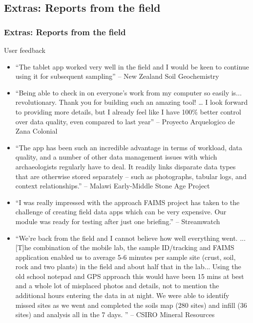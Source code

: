 \documentclass[
	aspectratio=169, %
	12pt, %
	t, %
]{beamer}
\begin{document}
\begin{refsegment}
\section{Extras: Reports from the field}

\begin{sectionframe} %
	\frametitle{Extras: Reports from the field}


\end{sectionframe}

\begin{frame}[allowframebreaks]{User feedback}
    \begin{itemize}
        \item ``The tablet app worked very well in the field and I would be keen to continue using it for subsequent sampling'' -- New Zealand Soil Geochemistry
        \item ``Being able to check in on everyone's work from my computer so easily is... revolutionary. Thank you for building such an amazing tool! …  I look forward to providing more details, but I already feel like I have 100\%{} better control over data quality, even compared to last year'' -- Proyecto Arquelogico de Zana Colonial
        \item ``The app has been such an incredible advantage in terms of workload, data quality, and a number of other data management issues with which archaeologists regularly have to deal. It readily links disparate data types that are otherwise stored separately – such as photographs, tabular logs, and context relationships.'' -- Malawi Early-Middle Stone Age Project
        \item ``I was really impressed with the approach FAIMS project has taken to the challenge of creating field data apps which can be very expensive. Our module was ready for testing after just one briefing.'' -- Streamwatch
        \item ``We’re back from the field and I cannot believe how well everything went. ... [T]he combination of the mobile lab, the sample ID/tracking and FAIMS application enabled us to average 5-6 minutes per sample site (crust, soil, rock and two plants)  in the field and about half that in the lab... Using the old school notepad and GPS approach this would have been 15 mins at best and a whole lot of misplaced photos and details, not to mention the additional hours entering the data in at night. We were able to identify missed sites as we went and completed the soils map (280 sites) and infill (36 sites) and analysis all in the 7 days. '' -- CSIRO Mineral Resources
    \end{itemize}
\end{frame}
\end{refsegment}
\end{document}
